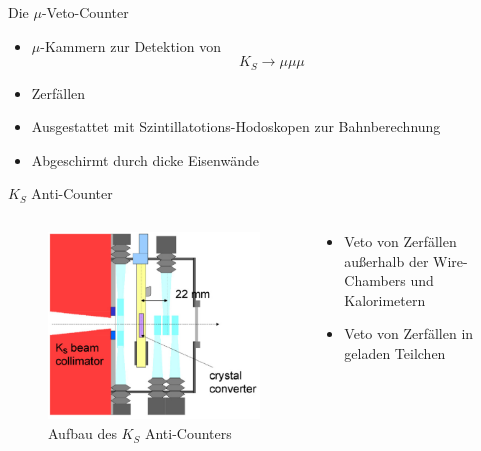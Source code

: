 \documentclass[aspectratio=1610, professionalfonts, 9pt, t]{beamer}
\begin{document}
  \begin{frame}{Die $\mu$-Veto-Counter}
    \begin{itemize}
      \item $\mu$-Kammern zur Detektion von
      \begin{equation*}
        K_S \rightarrow \mu \mu \mu
      \end{equation*}
      \item[] Zerfällen
      \item Ausgestattet mit Szintillatotions-Hodoskopen zur Bahnberechnung
      \item Abgeschirmt durch dicke Eisenwände
    \end{itemize}
  \end{frame}

  \begin{frame}{$K_S$ Anti-Counter}
    \begin{columns}[onlytextwidth]
      \begin{column}{0.4\textwidth}
        \begin{figure}[ht]
          \begin{center}
            \includegraphics[height=0.7\textheight]{Images/na48aks.png} %
            \caption{Aufbau des $K_S$ Anti-Counters}
          \end{center}
        \end{figure}
      \end{column}
      \begin{column}{0.5\textwidth}
        \begin{itemize}
          \item Veto von Zerfällen außerhalb der Wire-Chambers und Kalorimetern
          \item[\rightarrow] Veto von Zerfällen in geladen Teilchen
        \end{itemize}
      \end{column}
    \end{columns}
  \end{frame}
\end{document}
